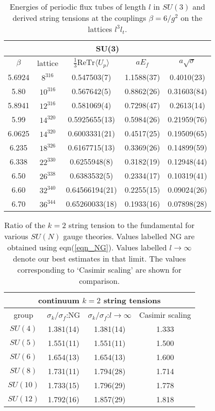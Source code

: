 \documentclass[12pt]{article}
\begin{document}
\begin{table}[htb]
\centering
\begin{tabular}{|cc|ccc|} \hline
\multicolumn{5}{|c|}{SU(3)} \\ \hline
$\beta$ & lattice & $\tfrac{1}{3}\text{ReTr}\langle U_p\rangle$ & $aE_f$ & $a\surd\sigma$ \\ \hline
5.6924 & $8^316$  & 0.547503(7)   & 1.1588(37) & 0.4010(23)  \\
5.80   & $10^316$ & 0.567642(5)   & 0.8862(26) & 0.31603(84) \\
5.8941 & $12^316$ & 0.581069(4)   & 0.7298(47) & 0.2613(14) \\
5.99   & $14^320$ & 0.5925655(13) & 0.5984(26) & 0.21959(76) \\
6.0625 & $14^320$ & 0.6003331(21) & 0.4517(25) & 0.19509(65) \\
6.235  & $18^326$ & 0.6167715(13) & 0.3369(26) & 0.14899(59) \\
6.338  & $22^330$ & 0.6255948(8)  & 0.3182(19) & 0.12948(44) \\
6.50   & $26^338$ & 0.6383532(5)  & 0.2334(17) & 0.10319(41) \\
6.60   & $32^340$ & 0.64566194(21) & 0.2255(15) & 0.09024(26)  \\
6.70   & $36^344$ & 0.65260033(18) & 0.1933(16) & 0.07898(28)  \\ \hline
\end{tabular}
\caption{Energies of periodic flux tubes of length $l$ in $SU(3)$ and derived string tensions
  at the couplings $\beta=6/g^2$ on the lattices $l^3l_t$.}
\label{table_Ksmall_SU3}
\end{table}


\begin{table}[htb]
\centering
\begin{tabular}{|c||c|c||c|} \hline
\multicolumn{4}{|c|}{continuum $k=2$ string tensions} \\ \hline
 group   &  $\sigma_k/\sigma_f$:NG  &  $\sigma_k/\sigma_f$:$l\to\infty$ & Casimir scaling \\ \hline
 $SU(4)$   & 1.381(14)  & 1.381(14)  & 1.333  \\
 $SU(5)$   & 1.551(11)  & 1.551(11)  & 1.500  \\
 $SU(6)$   & 1.654(13)  & 1.654(13)  & 1.600  \\
 $SU(8)$   & 1.731(11)  & 1.794(28)  & 1.714  \\
 $SU(10)$  & 1.733(15)  & 1.796(29)  & 1.778   \\
 $SU(12)$  & 1.792(16)  & 1.857(29)  & 1.818   \\ \hline
\end{tabular}
\caption{Ratio of the $k=2$ string tension to the fundamental for various $SU(N)$ gauge theories.
  Values labelled NG are obtained using eqn(\ref{eqn_NG}). Values labelled $l\to\infty$ denote our
  best estimates in that limit. The values corresponding to `Casimir scaling'
  are shown for comparison.}
\label{table_sigmak2}
\end{table}
\end{document}
